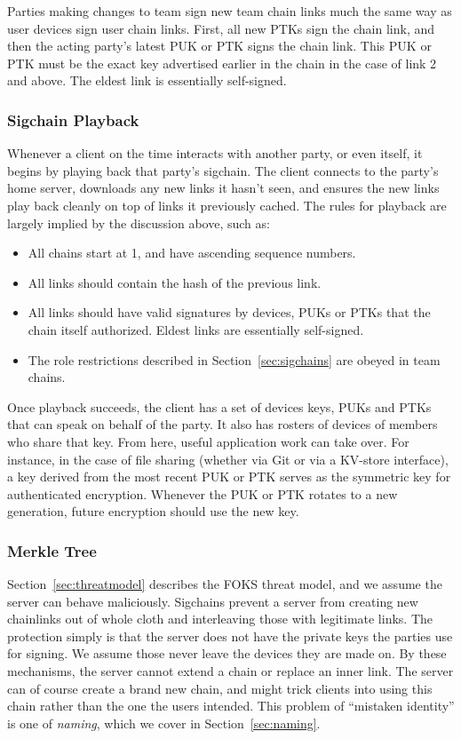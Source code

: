 Parties making changes to team sign new team chain links much the same way as user devices
sign user chain links. First, all new PTKs sign the chain link, and then the acting
party's latest PUK or PTK signs the chain link. This PUK or PTK must be the exact key
advertised earlier in the chain in the case of link 2 and above. The eldest link
is essentially self-signed.

\subsubsection{Sigchain Playback}

Whenever a client on the time interacts with another party, or even itself, it
begins by playing back that party's sigchain. The client connects to the party's home
server, downloads any new links it hasn't seen, and ensures the new links play back
cleanly on top of links it previously cached. The rules for playback are largely
implied by the discussion above, such as:

\begin{itemize}\itemsep0em
    \item All chains start at 1, and have ascending sequence numbers.
    \item All links should contain the hash of the previous link.
    \item All links should have valid signatures by devices, PUKs or PTKs that the chain 
      itself authorized. Eldest links are essentially self-signed.
    \item The role restrictions described in Section~\ref{sec:sigchains} are obeyed in team chains.
\end{itemize}

Once playback succeeds, the client has a set of devices keys, PUKs and PTKs that can
speak on behalf of the party. It also has rosters of devices of members who share that
key. From here, useful application work can take over. For instance, in the case
of file sharing (whether via Git or via a KV-store interface), a key derived from the
most recent PUK or PTK serves as the symmetric key for authenticated encryption. 
Whenever the PUK or PTK rotates to a new generation, future encryption should use the
new key.

\subsubsection{Merkle Tree}
\label{sec:merkle}

Section~\ref{sec:threatmodel} describes the FOKS threat model, and we assume the
server can behave maliciously.  Sigchains prevent a server from creating new
chainlinks out of whole cloth and interleaving those with legitimate links. The
protection simply is that the server does not have the private keys the parties
use for signing. We assume those never leave the devices they are made on. By these 
mechanisms, the server cannot extend a chain or replace an inner link. The server can
of course create a brand new chain, and might trick clients into using this chain
rather than the one the users intended. This problem of ``mistaken identity'' is one
of \textit{naming}, which we cover in Section~\ref{sec:naming}.

